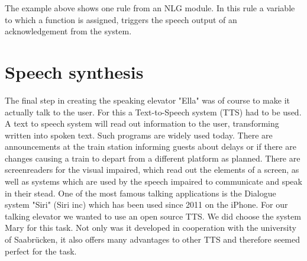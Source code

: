 \documentclass[a4paper, 12pt]{article}
\begin{document}
        The example above shows one rule from an NLG module. 
        In this rule a variable to which a function  is assigned, triggers the speech output of an acknowledgement from the system.
        
\newpage        
\section{Speech synthesis}
The final step in creating the speaking elevator "Ella" was of course to make it actually talk to the user.
For this a Text-to-Speech system (TTS) had to be used. A text to speech system will read out information to the user, transforming written into spoken text.
Such programs are widely used today. 
There are announcements at the train station informing guests about delays or if there are changes causing a train to depart from a different platform as planned.
There are screenreaders for the visual impaired, which read out the elements of a screen, as well as systems which are used by the speech impaired to communicate and speak in their stead.
One of the most famous talking applications is the Dialogue system "Siri" (Siri inc) which has been used since 2011 on the iPhone. \newline \newline
For our talking elevator we wanted to use an open source TTS. 
We did choose the system Mary for this task.
Not only was it developed in cooperation with the university of Saabrücken, it also offers many advantages to other TTS and therefore seemed perfect for the task.\newline
\end{document}
